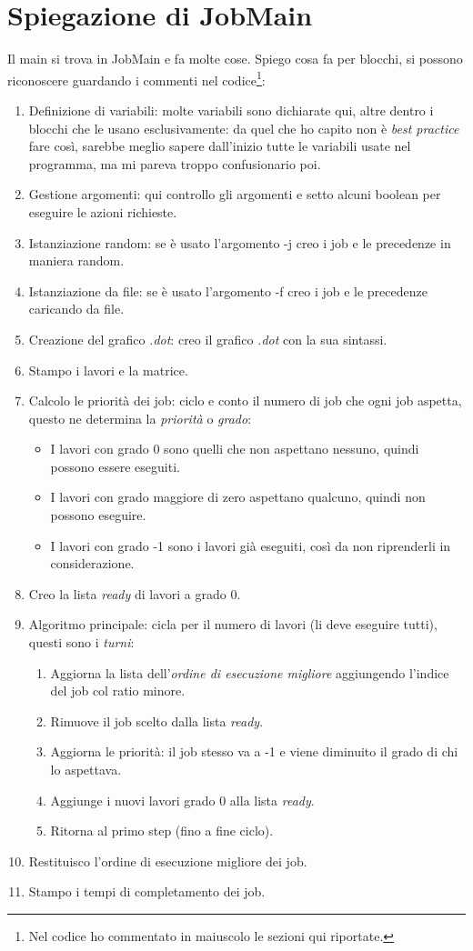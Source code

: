 \documentclass[12pt, letterpaper]{article}
\begin{document}
\section{Spiegazione di JobMain}
Il main si trova in JobMain e fa molte cose.
Spiego cosa fa per blocchi, si possono riconoscere guardando i commenti nel codice\footnote{Nel codice ho commentato in maiuscolo le sezioni qui riportate.}:
\begin{enumerate}
\item{Definizione di variabili: molte variabili sono dichiarate qui, altre dentro i blocchi che le usano esclusivamente: da quel che ho capito non è \textit{best practice} fare così, sarebbe meglio sapere dall'inizio tutte le variabili usate nel programma, ma mi pareva troppo confusionario poi.}
\item{Gestione argomenti: qui controllo gli argomenti e setto alcuni boolean per eseguire le azioni richieste.}
\item{Istanziazione random: se è usato l'argomento -j creo i job e le precedenze in maniera random.}
\item{Istanziazione da file: se è usato l'argomento -f creo i job e le precedenze caricando da file.}
\item{Creazione del grafico \textit{.dot}: creo il grafico \textit{.dot} con la sua sintassi.}
\item{Stampo i lavori e la matrice.}
\item{Calcolo le priorità dei job: ciclo e conto il numero di job che ogni job aspetta, questo ne determina la \textit{priorità} o \textit{grado}:
	\begin{itemize}
	\item{I lavori con grado 0 sono quelli che non aspettano nessuno, quindi possono essere eseguiti.}
	\item{I lavori con grado maggiore di zero aspettano qualcuno, quindi non possono eseguire.}
	\item{I lavori con grado -1 sono i lavori già eseguiti, così da non riprenderli in considerazione.}
	\end{itemize}}
\item{Creo la lista \textit{ready} di lavori a grado 0.}
\item{Algoritmo principale: cicla per il numero di lavori (li deve eseguire tutti), questi sono i \textit{turni}:
\begin{enumerate}
\item{Aggiorna la lista dell'\textit{ordine di esecuzione migliore} aggiungendo l'indice del job col ratio minore.}
\item{Rimuove il job scelto dalla lista \textit{ready}.}
\item{Aggiorna le priorità: il job stesso va a -1 e viene diminuito il grado di chi lo aspettava.}
\item{Aggiunge i nuovi lavori grado 0 alla lista \textit{ready}.} 
\item{Ritorna al primo step (fino a fine ciclo).}
\end{enumerate}}
\item{Restituisco l'ordine di esecuzione migliore dei job.}
\item{Stampo i tempi di completamento dei job.}
\end{enumerate}
\end{document}
